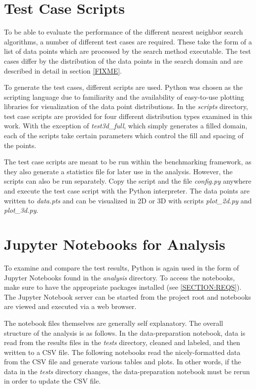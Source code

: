 \section{Test Case Scripts}
\label{SECTION:TESTCASESCRIPTS}

To be able to evaluate the performance of the different nearest neighbor search algorithms, a number of different test cases are required. These take the form of a list of data points which are processed by the search method executable. The test cases differ by the distribution of the data points in the search domain and are described in detail in section \ref{FIXME}.

To generate the test cases, different scripts are used. Python was chosen as the scripting language due to familiarity and the availability of easy-to-use plotting libraries for visualization of the data point distributions. In the {\itshape scripts} directory, test case scripts are provided for four different distribution types examined in this work. With the exception of {\itshape test3d\_full}, which simply generates a filled domain, each of the scripts take certain parameters which control the fill and spacing of the points.

The test case scripts are meant to be run within the benchmarking framework, as they also generate a statistics file for later use in the analysis. However, the scripts can also be run separately. Copy the script and the file {\itshape config.py} anywhere and execute the test case script with the Python interpreter. The data points are written to {\itshape data.pts} and can be visualized in 2D or 3D with scripts {\itshape plot\_2d.py} and {\itshape plot\_3d.py}.



\section{Jupyter Notebooks for Analysis}
\label{SECTION:NOTEBOOKS}

To examine and compare the test results, Python is again used in the form of Jupyter Notebooks found in the {\itshape analysis} directory. To access the notebooks, make sure to have the appropriate packages installed (see \ref{SECTION:REQS}). The Jupyter Notebook server can be started from the project root and notebooks are viewed and executed via a web browser.

The notebook files themselves are generally self explanatory. The overall structure of the analysis is as follows. In the data-preparation notebook, data is read from the results files in the {\itshape tests} directory, cleaned and labeled, and then written to a CSV file. The following notebooks read the nicely-formatted data from the CSV file and generate various tables and plots. In other words, if the data in the {\itshape tests} directory changes, the data-preparation notebook must be rerun in order to update the CSV file.

